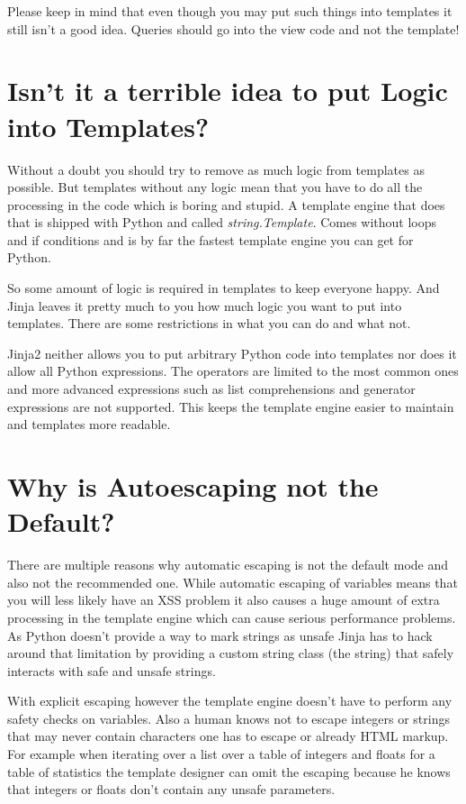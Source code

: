 \documentclass[a4paper,10pt,english]{sphinxmanual}
\begin{document}
Please keep in mind that even though you may put such things into templates
it still isn't a good idea.  Queries should go into the view code and not
the template!


\section{Isn't it a terrible idea to put Logic into Templates?}
\label{faq:isn-t-it-a-terrible-idea-to-put-logic-into-templates}
Without a doubt you should try to remove as much logic from templates as
possible.  But templates without any logic mean that you have to do all
the processing in the code which is boring and stupid.  A template engine
that does that is shipped with Python and called \emph{string.Template}.  Comes
without loops and if conditions and is by far the fastest template engine
you can get for Python.

So some amount of logic is required in templates to keep everyone happy.
And Jinja leaves it pretty much to you how much logic you want to put into
templates.  There are some restrictions in what you can do and what not.

Jinja2 neither allows you to put arbitrary Python code into templates nor
does it allow all Python expressions.  The operators are limited to the
most common ones and more advanced expressions such as list comprehensions
and generator expressions are not supported.  This keeps the template engine
easier to maintain and templates more readable.


\section{Why is Autoescaping not the Default?}
\label{faq:why-is-autoescaping-not-the-default}
There are multiple reasons why automatic escaping is not the default mode
and also not the recommended one.  While automatic escaping of variables
means that you will less likely have an XSS problem it also causes a huge
amount of extra processing in the template engine which can cause serious
performance problems.  As Python doesn't provide a way to mark strings as
unsafe Jinja has to hack around that limitation by providing a custom
string class (the  string) that safely interacts with safe
and unsafe strings.

With explicit escaping however the template engine doesn't have to perform
any safety checks on variables.  Also a human knows not to escape integers
or strings that may never contain characters one has to escape or already
HTML markup.  For example when iterating over a list over a table of
integers and floats for a table of statistics the template designer can
omit the escaping because he knows that integers or floats don't contain
any unsafe parameters.
\end{document}
